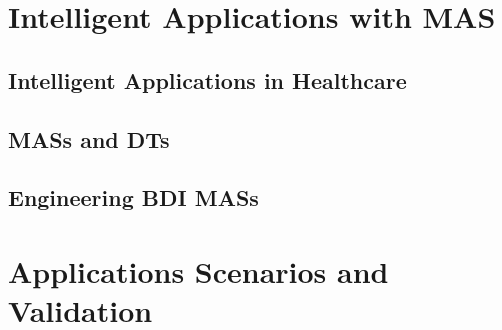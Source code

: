 \documentclass[12pt,a4paper,openright,twoside]{book}
\begin{document}


\part{Intelligent Applications with \acl{MAS}}

\chapter{Intelligent Applications in Healthcare}
\label{chap:mas:requirements}



\chapter{\aclp{MAS} and \aclp{DT}}
\label{chap:mas:mas-dt}



\chapter{Engineering \acs{BDI} \aclp{MAS}}
\label{chap:mas:engineering}




\part{Applications Scenarios and Validation}
\end{document}
